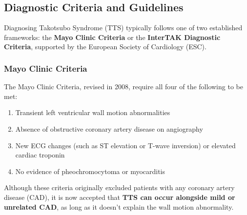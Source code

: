 \documentclass[12pt, BSc]{muthesis}
\begin{document}
\subsection{Diagnostic Criteria and Guidelines}

Diagnosing Takotsubo Syndrome (TTS) typically follows one of two established frameworks: the \textbf{Mayo Clinic Criteria} or the \textbf{InterTAK Diagnostic Criteria}, supported by the European Society of Cardiology (ESC).

\subsubsection{Mayo Clinic Criteria}
The Mayo Clinic Criteria, revised in 2008, require all four of the following to be met:

\begin{enumerate}
    \item Transient left ventricular wall motion abnormalities \cite{PRASAD2008408}
    \item Absence of obstructive coronary artery disease on angiography \cite{PRASAD2008408}
    \item New ECG changes (such as ST elevation or T-wave inversion) or elevated cardiac troponin \cite{PRASAD2008408}
    \item No evidence of pheochromocytoma or myocarditis \cite{PRASAD2008408}
\end{enumerate}

Although these criteria originally excluded patients with any coronary artery disease (CAD), it is now accepted that \textbf{TTS can occur alongside mild or unrelated CAD}, as long as it doesn't explain the wall motion abnormality\cite{Templin2015}.



\end{document}
